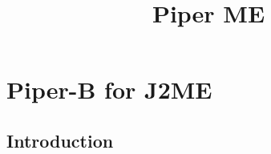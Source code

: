 

\newtheorem{atheorem}{Theorem}[section]
\newtheorem{adefinition}{Definition}[section]
\newtheorem{analgo}{Algorithm}[section]
\newtheorem{anexample}{Example}[section]

\newtheorem{acorollary}[atheorem]{Korollar}
\newtheorem{asubtheo}[atheorem]{Lemma}
\newtheorem{atinytheo}[atheorem]{Proposition}
\newcommand{\Path}{{\rm Path}}
\newcommand{\LO}{{\rm LO}}
\newcommand{\Abl}{\mbox{\rm Abl}}
\newcommand{\LAST}{{\rm fin}}
\newcommand{\DIST}{\mbox{\rm DIST}}
\newcommand{\Root}{{\rm root}}
\newcommand{\Front}{\mbox{\rm front}}
\newcommand{\KOST}{{\cal C}}
\newcommand{\Choose}{{\rm Choose}}
\newcommand{\Eword}{\Box}
\newcommand{\Pbegin}{{\rm\bf begin }}
\newcommand{\Pprocedure}{{\rm\bf procedure }}
\newcommand{\Pfunction}{{\rm\bf function }}
\newcommand{\Pinteger}{{\rm\bf integer}}
\newcommand{\Pend}{{\rm\bf end }}
\newcommand{\Pfor}{{\rm\bf for }}
\newcommand{\Pforall}{{\rm\bf for all }}
\newcommand{\Pendfor}{{\rm\bf endfor }}
\newcommand{\Pto}{{\rm\bf to }}
\newcommand{\Pdownto}{{\rm\bf downto }}
\newcommand{\Pdo}{{\rm\bf do }}
\newcommand{\Pif}{{\rm\bf if }}
\newcommand{\Pthen}{{\rm\bf then }}
\newcommand{\Pendif}{{\rm\bf endif }}
\newcommand{\Pelse}{{\rm\bf else }}
\newcommand{\Pendelse}{{\rm\bf endelse }}
\newcommand{\Preturn}{{\rm\bf return }}
\newcommand{\Real}{{\rm{I\hspace*{-0.4ex}R}}}
\newcommand{\Nat}{{\rm{I\hspace*{-0.4ex}N}}}
\newcommand{\Bool}{{\rm{I\hspace*{-0.4ex}B}}}
\newcommand{\Uint}{{\rm{I\hspace*{-0.5ex}I}}}
\newcommand{\Zet}{{\rm\sf Z\hspace*{-1.0ex}Z}}
\newcommand{\QuestEq}{\stackrel{?}{=}}
\newcommand{\DefEq}{:=}
\newcommand{\DisUnion}{\stackrel{.}{\cup}}
\newcommand{\IsPref}{\le_{\mbox{\tiny pr"af}}}


\title{
{\LARGE Piper ME}\\
}

\maketitle


\chapter{Piper-B for J2ME}

\section{Introduction}

